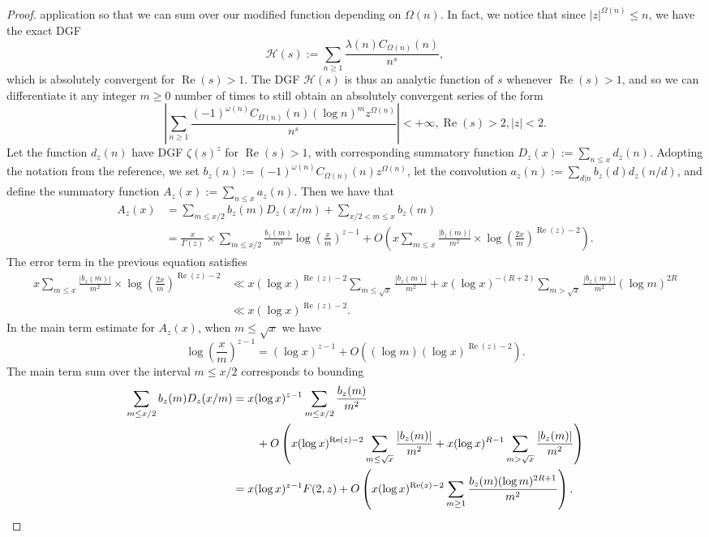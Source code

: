 \documentclass[11pt,reqno,a4letter]{article}
\numberwithin{figure}{section}
\numberwithin{table}{section}
\theoremstyle{plain}
\numberwithin{theorem}{section}
\theoremstyle{definition}
\renewcommand{\Re}{\operatorname{Re}}
\begin{document}
\begin{proof}
application so that we can sum over our modified function depending on $\Omega(n)$. 
In fact, we notice that since $|z|^{\Omega(n)} \leq n$, we have the 
exact DGF 
\[
\mathcal{H}(s) := \sum_{n \geq 1} \frac{\lambda(n) C_{\Omega(n)}(n)}{n^s}, 
\]
which is absolutely convergent for $\Re(s) > 1$. The DGF $\mathcal{H}(s)$ is thus an 
analytic function of $s$ whenever $\Re(s) > 1$, and so we can differentiate it any integer 
$m \geq 0$ number of times to still obtain an absolutely convergent series of the form 
\[
\left\lvert \sum_{n \geq 1} \frac{(-1)^{\omega(n)} C_{\Omega(n)}(n) (\log n)^m z^{\Omega(n)}}{n^s} 
     \right\rvert < +\infty, \Re(s) > 2, |z| < 2. 
\]
Let the function $d_z(n)$ have DGF $\zeta(s)^{z}$ for $\Re(s) > 1$, with corresponding 
summatory function $D_z(x) := \sum_{n \leq x} d_z(n)$. 
Adopting the notation from the reference, we set 
$b_z(n) := (-1)^{\omega(n)} C_{\Omega(n)}(n) z^{\Omega(n)}$, let the convolution 
$a_z(n) := \sum_{d|n} b_z(d) d_z(n/d)$, and define the summatory function 
$A_z(x) := \sum_{n \leq x} a_z(n)$. Then we have that 
\begin{align*} 
A_z(x) & = \sum_{m \leq x/2} b_z(m) D_z(x/m) + \sum_{x/2 < m \leq x} b_z(m) \\ 
     & = \frac{x}{\Gamma(z)} \times \sum_{m \leq x/2} 
     \frac{b_z(m)}{m^2} \log\left(\frac{x}{m}\right)^{z-1} + 
     O\left(x \sum_{m \leq x} \frac{|b_z(m)|}{m^2} \times 
     \log\left(\frac{2x}{m}\right)^{\Re(z) - 2}\right). 
\end{align*} 
The error term in the previous equation satisfies 
\begin{align*} 
x \sum_{m \leq x} \frac{|b_z(m)|}{m^2} \times 
     \log\left(\frac{2x}{m}\right)^{\Re(z) - 2} & \ll 
     x (\log x)^{\Re(z) - 2} \sum_{m \leq \sqrt{x}} \frac{|b_z(m)|}{m^2} + 
     x (\log x)^{-(R+2)} \sum_{m > \sqrt{x}} \frac{|b_z(m)|}{m^2} (\log m)^{2R} \\ 
     & \ll x (\log x)^{\Re(z) - 2}. 
\end{align*} 
In the main term estimate for $A_z(x)$, when $m \leq \sqrt{x}$ we have 
\[
\log\left(\frac{x}{m}\right)^{z-1} = (\log x)^{z-1} + O\left((\log m) (\log x)^{\Re(z) - 2}\right). 
\]
The main term sum over the interval $m \leq x/2$ corresponds to bounding 
\begin{align*} 
\sum_{m \leq x/2} b_z(m) D_z(x/m) & = x (\log x)^{z-1} \sum_{m \leq x/2} \frac{b_z(m)}{m^2} \\ 
     & \phantom{=\quad\ } + 
     O\left(x (\log x)^{\Re(z)-2} \sum_{m \leq \sqrt{x}} \frac{|b_z(m)|}{m^2} + 
     x (\log x)^{R-1} \sum_{m > \sqrt{x}} \frac{|b_z(m)|}{m^2}\right) \\ 
     & = x (\log x)^{z-1} F(2, z) + O\left( 
     x (\log x)^{\Re(z)-2} \sum_{m \geq 1} \frac{b_z(m) (\log m)^{2R+1}}{m^2} 
     \right).
     \qedhere  
\end{align*} 
\end{proof} 
\end{document}
